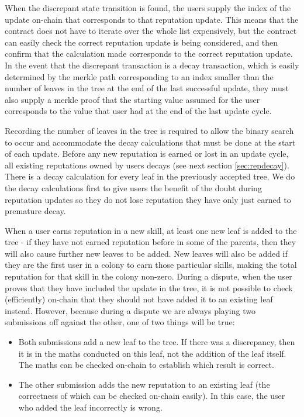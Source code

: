 When the discrepant state transition is found, the users supply the index of the update on-chain that corresponds to that reputation update. This means that the contract does not have to iterate over the whole list expensively, but the contract can easily check the correct reputation update is being considered, and then confirm that the calculation made corresponds to the correct reputation update. In the event that the discrepant transaction is a decay transaction, which is easily determined by the merkle path corresponding to an index smaller than the number of leaves in the tree at the end of the last successful update, they must also supply a merkle proof that the starting value assumed for the user corresponds to the value that user had at the end of the last update cycle.

Recording the number of leaves in the tree is required to allow the binary search to occur and accommodate the decay calculations that must be done at the start of each update. Before any new reputation is earned or lost in an update cycle, all existing reputations owned by users decays (see next section \ref{sec:repdecay}). There is a decay calculation for every leaf in the previously accepted tree. We do the decay calculations first to give users the benefit of the doubt during reputation updates so they do not lose reputation they have only just earned to premature decay.

When a user earns reputation in a new skill, at least one new leaf is added to the tree - if they have not earned reputation before in some of the parents, then they will also cause further new leaves to be added. New leaves will also be added if they are the first user in a colony to earn those particular skills, making the total reputation for that skill in the colony non-zero. During a dispute, when the user proves that they have included the update in the tree, it is not possible to check (efficiently) on-chain that they should not have added it to an existing leaf instead. However, because during a dispute we are always playing two submissions off against the other, one of two things will be true:
\begin{itemize}
 \item Both submissions add a new leaf to the tree. If there was a discrepancy, then it is in the maths conducted on this leaf, not the addition of the leaf itself. The maths can be checked on-chain to establish which result is correct.
 \item The other submission adds the new reputation to an existing leaf (the correctness of which can be checked on-chain easily). In this case, the user who added the leaf incorrectly is wrong.
\end{itemize}






